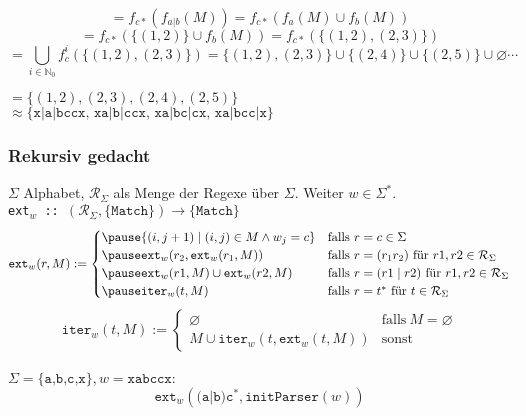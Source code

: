 \documentclass{beamer}
\begin{document}
\begin{frame}[t,label=bsp]
{$$                = f_{c*}(f_{a|b}(M))
                = f_{c*}(f_a(M) \cup f_b(M))
            $$
            \pause
            $$
                = f_{c*}(\{(1,2)\} \cup f_b(M))
                = f_{c*}(\{(1,2),(2,3)\})
            $$
            \pause
            $$
                = \bigcup_{i \in \mathbb{N}_0} f_c^i(\{(1,2),(2,3)\})
                = \{(1,2),(2,3)\} \cup \{(2,4)\} \cup \{(2,5)\} \cup \varnothing \cdots
            $$
            \pause
            \begin{center}
                $= \{(1,2),(2,3),(2,4),(2,5)\}$\\[5pt]
                $\approx\{\texttt{x|a|bccx, xa|b|ccx, xa|bc|cx, xa|bcc|x}\}$
            \end{center}
        }
    \end{frame}

    \begin{frame}[t]
        \frametitle{Rekursiv gedacht}
        {\small
            $\Sigma$ Alphabet, $\mathcal{R}_\Sigma$ als Menge der Regexe über $\Sigma$. Weiter $w \in \Sigma^*$.} \\[5pt]
        {\scriptsize
            \texttt{ext$_w$ ::\ $(\mathcal{R}_\Sigma, \{\texttt{Match}\}) \to \{\texttt{Match}\}$}
            $$
                \texttt{ext}_w(r, M) := \begin{cases}
                    \pause\{(i, j+1) \mid (i,j) \in M \land w_j = c\} & \text{falls}\ r = c \in \Sigma\\
                    \pause\texttt{ext}_w(r_2, \texttt{ext}_w(r_1, M))     & \text{falls}\ r = (r_1r_2)\ \text{für}\ r1,r2 \in \mathcal{R}_\Sigma\\
                    \pause\texttt{ext}_w(r1, M) \cup \texttt{ext}_w(r2,M) & \text{falls}\ r = (r1 \mid r2)\ \text{für}\ r1,r2 \in \mathcal{R}_\Sigma\\
                    \pause\texttt{iter}_w(t, M)                        & \text{falls}\ r = t^*\ \text{für}\ t \in \mathcal{R}_\Sigma
                \end{cases}
            $$$$
            \texttt{iter}_w(t, M) := \begin{cases}
                    \varnothing & \text{falls}\ M = \varnothing\\
                    M \cup \texttt{iter}_w(t, \texttt{ext}_w(t, M)) & \text{sonst}
                \end{cases}
            $$\\[5pt]
            \pause
            $\Sigma = \{\texttt{a,b,c,x}\}, w = \texttt{xabccx}:$
            $$
                \texttt{ext}_w(\texttt{(a|b)c$^\texttt{*}$}, \texttt{initParser}(w))
            $$
        }
    \end{frame}
\end{document}

